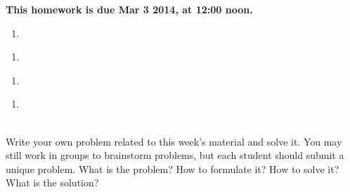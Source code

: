 \documentclass[]{article}
\newif\ifsolutions
\renewcommand{\answer}[1]{{\color{mydarkblue}\textbf{}#1}}
\begin{document}
\maketitle
{}
\vspace{0.5em}
{\Large{\textbf{This homework is due Mar 3 2014, at 12:00 noon.}}}

\begin{qunlist}
  
\begin{enumerate}
\qpart
\item
\ifsolutions{ \answer 
{
}}\fi


\ifsolutions{ \answer {
\textbf{Motivation}
}}\fi
\end{enumerate}

  
\begin{enumerate}
\qpart
\item
\ifsolutions{ \answer 
{
}}\fi


\ifsolutions{ \answer {
\textbf{Motivation} 
}}\fi 
\end{enumerate}



\begin{enumerate}
\qpart
\item

\ifsolutions{ \answer 
{
}}\fi


\ifsolutions{ \answer {
\textbf{Motivation}
}}\fi
    
\end{enumerate}


\begin{enumerate}
\qpart
\item 

\end{enumerate}


\qpart


\qpart


\qpart


\qpart


 \\
Write your own problem related to this week's material and solve it. 
You may still work in groups to brainstorm problems, 
but each student should submit a unique problem.  
What is the problem? How to formulate it? 
How to solve it? What is the solution?
  
  
    
\end{qunlist}
\end{document}

